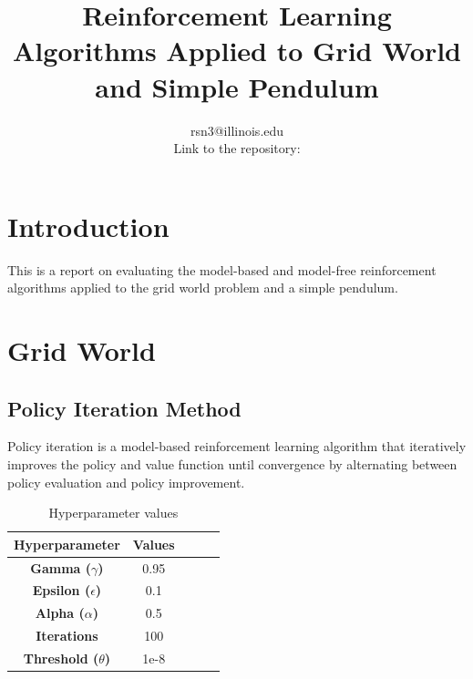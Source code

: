\documentclass[conference]{IEEEtran}
\begin{document}
\title{Reinforcement Learning Algorithms Applied to Grid World and Simple Pendulum\\
}

\author{
rsn3@illinois.edu\\
Link to the repository:\href{https://github.com/uiuc-ae598-rl-2023-spring/hw1-dp-raghavvs}{\faGithubSquare}   \\ 
}

\maketitle

\section{Introduction}
This is a report on evaluating the model-based and model-free reinforcement algorithms applied to the grid world problem and a simple pendulum.

\section{Grid World}

\subsection{Policy Iteration Method}

Policy iteration is a model-based reinforcement learning algorithm that iteratively improves the policy and value function until convergence by alternating between policy evaluation and policy improvement. \cite{b1}

\begin{table}[h]
\caption{Hyperparameter values}
\renewcommand{\arraystretch}{1.5}
\centering
\begin{tabular}{|c|c|c|c|c|}
\hline
\textbf{Hyperparameter} &  \textbf{Values}  \\ \hline
\textbf{Gamma ($\gamma$)} & 0.95  \\ \hline
\textbf{Epsilon ($\epsilon$)} & 0.1  \\ \hline
\textbf{Alpha ($\alpha$)} & 0.5  \\ \hline
\textbf{Iterations} & 100 \\ \hline
\textbf{Threshold ($\theta$)} & 1e-8 \\ \hline
\end{tabular} \\
\label{tab:hyperparameters}
\end{table}
\end{document}
